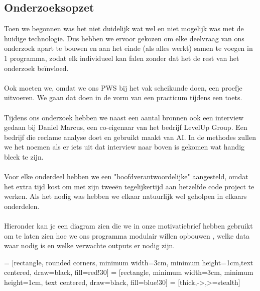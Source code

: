 \documentclass[12pt]{article}
\begin{document}
\subsection{Onderzoeksopzet}
\begin{multicols}{2}
Toen we begonnen was het niet duidelijk wat wel en niet mogelijk was met de huidige technologie. Dus hebben we ervoor gekozen om elke deelvraag van ons onderzoek apart te bouwen en aan het einde (als alles werkt) samen te voegen in 1 programma, zodat elk individueel kan falen zonder dat het de rest van het onderzoek beïnvloed.
\\\\
Ook moeten we, omdat we ons PWS bij het vak scheikunde doen, een proefje uitvoeren. We gaan dat doen in de vorm van een practicum tijdens een toets.
\\\\
Tijdens ons onderzoek hebben we naast een aantal bronnen ook een interview gedaan bij Daniel Marcus, een co-eigenaar van het bedrijf LevelUp Group. Een bedrijf die reclame analyse doet en gebruikt maakt van AI. In de methodes zullen we het noemen als er iets uit dat interview naar boven is gekomen wat handig bleek te zijn.
\\\\
Voor elke onderdeel hebben we een "hoofdverantwoordelijke" aangesteld, omdat het extra tijd kost om met zijn tweeën tegelijkertijd aan hetzelfde code project te werken. Als het nodig was hebben we elkaar natuurlijk wel geholpen in elkaars onderdelen. 
\\\\
Hieronder kan je een diagram zien die we in onze motivatiebrief hebben gebruikt om te laten zien hoe we ons programma modulair willen opbouwen , welke data waar nodig is en welke verwachte outputs er nodig zijn.
\end{multicols}

 = [rectangle, rounded corners, minimum width=3cm, minimum height=1cm,text centered, draw=black, fill=red!30]
 = [rectangle, minimum width=3cm, minimum height=1cm, text centered, draw=black, fill=blue!30]
 = [thick,->,>=stealth]
\end{document}
